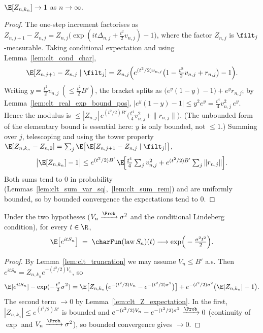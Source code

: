 \begin{lemma}\label{lem:clt_Z_expectation}
\leanok
{}
$\E[Z_{n,k_n}]\to1$ as $n\to\infty$.
\end{lemma}

\begin{proof}\leanok
The one-step increment factorises as
$Z_{n,j+1}-Z_{n,j}=Z_{n,j}\big(\exp(it\Delta_{n,j}+\tfrac{t^2}{2}v_{n,j})-1\big)$,
where the factor $Z_{n,j}$ is $\filt_j$-measurable. Taking conditional
expectation and using Lemma~\ref{lem:clt_cond_char},
\[
  \E[Z_{n,j+1}-Z_{n,j}\mid\filt_j]
  = Z_{n,j}\Big(e^{(t^2/2)v_{n,j}}\big(1-\tfrac{t^2}{2}v_{n,j}+r_{n,j}\big)-1\Big).
\]
Writing $y=\tfrac{t^2}{2}v_{n,j}\ (\le\tfrac{t^2}{2}B')$, the bracket splits as
$\big(e^{y}(1-y)-1\big)+e^{y}r_{n,j}$; by
Lemma~\ref{lem:clt_real_exp_bound_pos}, $|e^{y}(1-y)-1|\le y^2 e^{y}
=\tfrac{t^4}{4}v_{n,j}^2\,e^{y}$. Hence the modulus is
$\le|Z_{n,j}|\,e^{(t^2/2)B'}\big(\tfrac{t^4}{4}v_{n,j}^2+\|r_{n,j}\|\big)$.
(The unbounded form of the elementary bound is essential here: $y$ is only bounded,
not $\le1$.) Summing over $j$, telescoping and using the tower property
$\E[Z_{n,k_n}-Z_{n,0}]=\sum_j\E\big[\E[Z_{n,j+1}-Z_{n,j}\mid\filt_j]\big]$,
\[
  \big|\E[Z_{n,k_n}]-1\big|
  \le e^{(t^2/2)B'}\,\E\!\Big[\tfrac{t^4}{4}\textstyle\sum_j v_{n,j}^2
      + e^{(t^2/2)B'}\sum_j\|r_{n,j}\|\Big].
\]
Both sums tend to $0$ in probability
(Lemmas~\ref{lem:clt_sum_var_sq},~\ref{lem:clt_sum_rem}) and are uniformly
bounded, so by bounded convergence the expectations tend to $0$.
\end{proof}

\begin{lemma}\label{lem:clt_product}
\leanok
{}
Under the two hypotheses ($V_n\xrightarrow{\Prob}\sigma^2$ and the conditional
Lindeberg condition), for every $t\in\R$,
\[
  \E\big[e^{itS_n}\big]\;=\;\charFun(\mathrm{law}\,S_n)(t)
  \longrightarrow \exp\!\Big(-\tfrac{\sigma^2 t^2}{2}\Big).
\]
\end{lemma}

\begin{proof}\leanok
{}
By Lemma~\ref{lem:clt_truncation} we may assume $V_n\le B'$ a.s. Then
$e^{itS_n}=Z_{n,k_n}e^{-(t^2/2)V_n}$, so
\[
  \E[e^{itS_n}] - \exp(-\tfrac{t^2}{2}\sigma^2)
  = \E\big[Z_{n,k_n}\big(e^{-(t^2/2)V_n}-e^{-(t^2/2)\sigma^2}\big)\big]
    + e^{-(t^2/2)\sigma^2}\big(\E[Z_{n,k_n}]-1\big).
\]
The second term $\to0$ by Lemma~\ref{lem:clt_Z_expectation}. In the first,
$|Z_{n,k_n}|\le e^{(t^2/2)B'}$ is bounded and
$e^{-(t^2/2)V_n}-e^{-(t^2/2)\sigma^2}\xrightarrow{\Prob}0$ (continuity of $\exp$
and $V_n\xrightarrow{\Prob}\sigma^2$), so bounded convergence gives $\to0$.
\end{proof}

